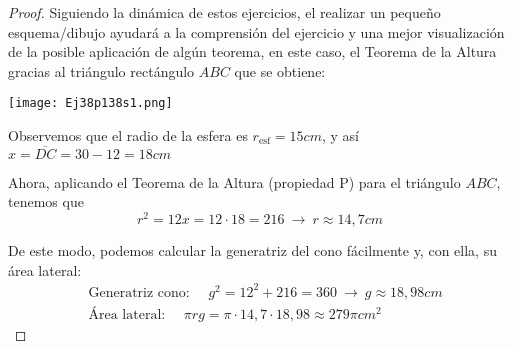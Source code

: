 \begin{proof}
	Siguiendo la dinámica de estos ejercicios, el realizar un pequeño esquema/dibujo ayudará a la comprensión del ejercicio y una mejor visualización de la posible aplicación de algún teorema, en este caso, el Teorema de la Altura gracias al triángulo rectángulo $ABC$ que se obtiene:

\newpage	
	
	\begin{multicols}{2}
		
		\begin{center}
		\texttt{[image: Ej38p138s1.png]}
	\end{center}
	
	
				
	\columnbreak
	
	\begin{minipage}{7cm}
			Observemos que el radio de la esfera es $r_{\text{esf}}=15cm$, y así $x=\overline{DC}=30-12=18cm$
			
			Ahora, aplicando el Teorema de la Altura (propiedad P) para el triángulo $ABC$, tenemos que $$r^2=12x=12\cdot18=216 \ \rightarrow \ r\approx 14,7cm$$	
			
		\end{minipage}
	\end{multicols}
	
	De este modo, podemos calcular la generatriz del cono fácilmente y, con ella, su área lateral:
	\vspace{-0.2cm}
		\begin{align*}
			&\text{Generatriz cono: } \quad g^2=12^2+216=360 \ \rightarrow \ g\approx18,98cm\\
			&\text{Área lateral: }\quad\pi rg=\pi\cdot14,7\cdot18,98\approx279\pi cm^2
		\end{align*}
	\vspace{-0.8cm}
\end{proof}
	
